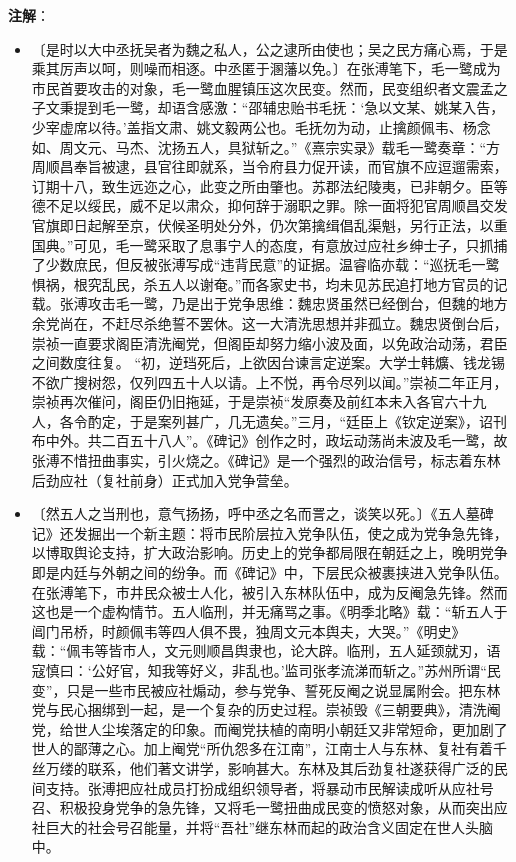 \documentclass[12pt,UTF-8,openany]{ctexbook}
\begin{document}
\newpage

\textbf{注解}：

\vspace{-1em}

\begin{itemize}
    \setlength\itemsep{-0.2em}
    \item〔是时以大中丞抚吴者为魏之私人，公之逮所由使也；吴之民方痛心焉，于是乘其厉声以呵，则噪而相逐。中丞匿于溷藩以免。〕在张溥笔下，毛一鹭成为市民首要攻击的对象，毛一鹭血腥镇压这次民变。然而，民变组织者文震孟之子文秉提到毛一鹭，却语含感激：“邵辅忠贻书毛抚：‘急以文某、姚某入告，少宰虚席以待。’盖指文肃、姚文毅两公也。毛抚勿为动，止擒颜佩韦、杨念如、周文元、马杰、沈扬五人，具狱斩之。”《熹宗实录》载毛一鹭奏章：“方周顺昌奉旨被逮，县官往即就系，当令府县力促开读，而官旗不应逗遛需索，订期十八，致生远迩之心，此变之所由肇也。苏郡法纪陵夷，已非朝夕。臣等德不足以绥民，威不足以肃众，抑何辞于溺职之罪。除一面将犯官周顺昌交发官旗即日起解至京，伏候圣明处分外，仍次第擒缉倡乱渠魁，另行正法，以重国典。”可见，毛一鹭采取了息事宁人的态度，有意放过应社乡绅士子，只抓捕了少数庶民，但反被张溥写成“违背民意”的证据。温睿临亦载：“巡抚毛一鹭惧祸，根究乱民，杀五人以谢奄。”而各家史书，均未见苏民追打地方官员的记载。张溥攻击毛一鹭，乃是出于党争思维：魏忠贤虽然已经倒台，但魏的地方余党尚在，不赶尽杀绝誓不罢休。这一大清洗思想并非孤立。魏忠贤倒台后，崇祯一直要求阁臣清洗阉党，但阁臣却努力缩小波及面，以免政治动荡，君臣之间数度往复。 “初，逆珰死后，上欲因台谏言定逆案。大学士韩爌、钱龙锡不欲广搜树怨，仅列四五十人以请。上不悦，再令尽列以闻。”崇祯二年正月，崇祯再次催问，阁臣仍旧拖延，于是崇祯“发原奏及前红本未入各官六十九人，各令酌定，于是案列甚广，几无遗矣。”三月，“廷臣上《钦定逆案》，诏刊布中外。共二百五十八人”。《碑记》创作之时，政坛动荡尚未波及毛一鹭，故张溥不惜扭曲事实，引火烧之。《碑记》是一个强烈的政治信号，标志着东林后劲应社（复社前身）正式加入党争营垒。
    \item〔然五人之当刑也，意气扬扬，呼中丞之名而詈之，谈笑以死。〕《五人墓碑记》还发掘出一个新主题：将市民阶层拉入党争队伍，使之成为党争急先锋，以博取舆论支持，扩大政治影响。历史上的党争都局限在朝廷之上，晚明党争即是内廷与外朝之间的纷争。而《碑记》中，下层民众被裹挟进入党争队伍。在张溥笔下，市井民众被士人化，被引入东林队伍中，成为反阉急先锋。然而这也是一个虚构情节。五人临刑，并无痛骂之事。《明季北略》载：“斩五人于阊门吊桥，时颜佩韦等四人俱不畏，独周文元本舆夫，大哭。”《明史》载：“佩韦等皆市人，文元则顺昌舆隶也，论大辟。临刑，五人延颈就刃，语寇慎曰：‘公好官，知我等好义，非乱也。’监司张孝流涕而斩之。”苏州所谓“民变”，只是一些市民被应社煽动，参与党争、誓死反阉之说显属附会。把东林党与民心捆绑到一起，是一个复杂的历史过程。崇祯毁《三朝要典》，清洗阉党，给世人尘埃落定的印象。而阉党扶植的南明小朝廷又非常短命，更加剧了世人的鄙薄之心。加上阉党“所仇怨多在江南”，江南士人与东林、复社有着千丝万缕的联系，他们著文讲学，影响甚大。东林及其后劲复社遂获得广泛的民间支持。张溥把应社成员打扮成组织领导者，将暴动市民解读成听从应社号召、积极投身党争的急先锋，又将毛一鹭扭曲成民变的愤怒对象，从而突出应社巨大的社会号召能量，并将“吾社”继东林而起的政治含义固定在世人头脑中。
\end{itemize}
\end{document}
